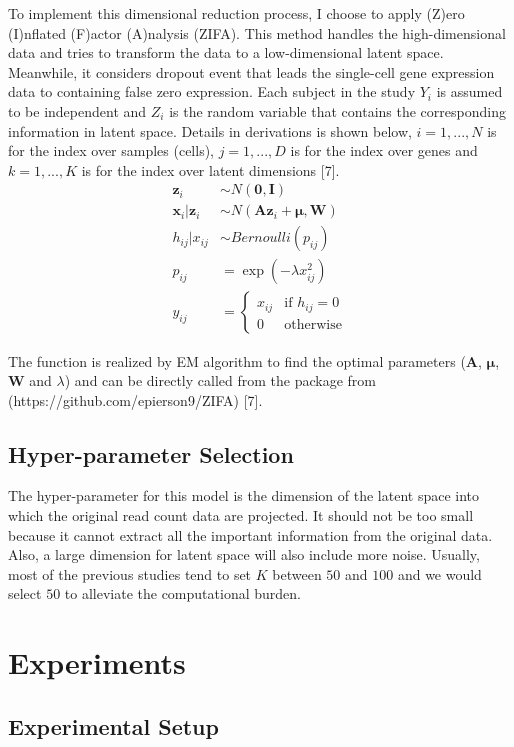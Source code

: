 \documentclass[12pt]{article}
\theoremstyle{definition}
\begin{document}
To implement this dimensional reduction process, I choose to apply (Z)ero (I)nflated (F)actor (A)nalysis (ZIFA). This method handles the high-dimensional data and tries to transform the data to a low-dimensional latent space. Meanwhile, it considers dropout event that leads the single-cell gene expression data to containing false zero expression. Each subject in the study $Y_i$ is assumed to be independent and $Z_i$ is the random variable that contains the corresponding information in latent space. Details in derivations is shown below, $i=1,...,N$ is for the index over samples (cells), $j=1,...,D$ is for the index over genes and $k=1,..., K$ is for the index over latent dimensions [7].
\begin{align}
    \bm{z}_i & \sim N(\bm{0}, \bm{I})\\
    \bm{x}_i | \bm{z}_i & \sim N(\bm{A}\bm{z}_i+\bm{\mu}, \bm{W})\\
    h_{ij} | x_{ij} & \sim Bernoulli(p_{ij})\\
    p_{ij} & =\exp(-\lambda x^2_{ij})\\
    y_{ij} & = \begin{cases}
      x_{ij} & \text{if $h_{ij} = 0$}\\
      0 & \text{otherwise}
    \end{cases}     
\end{align}

The function is realized by EM algorithm to find the optimal parameters ($\bm{A}$, $\bm{\mu}$, $\bm{W}$ and $\lambda$) and can be directly called from the package from (https://github.com/epierson9/ZIFA) [7].

\subsection{Hyper-parameter Selection}
The hyper-parameter for this model is the dimension of the latent space into which the original read count data are projected. It should not be too small because it cannot extract all the important information from the original data. Also, a large dimension for latent space will also include more noise. Usually, most of the previous studies tend to set $K$ between $50$ and $100$ and we would select $50$ to alleviate the computational burden.

\section{Experiments}
\subsection{Experimental Setup}
\end{document}

